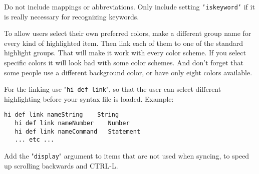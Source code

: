 Do not include mappings or abbreviations.
Only include setting \texttt{'iskeyword'} if it is really necessary for recognizing keywords.

To allow users select their own preferred colors, make a different group name for every kind of highlighted item.
Then link each of them to one of the standard highlight groups.
That will make it work with every color scheme.
If you select specific colors it will look bad with some color schemes.
And don't forget that some people use a different background color, or have only eight colors available.

For the linking use "\texttt{hi def link}", so that the user can select different highlighting before your syntax file is loaded.
Example:

\begin{Verbatim}[samepage=true]
   hi def link nameString    String
   hi def link nameNumber    Number
   hi def link nameCommand   Statement
   ... etc ...
\end{Verbatim}

Add the "\texttt{display}" argument to items that are not used when syncing, to speed up scrolling backwards and CTRL-L.
\clearpage
